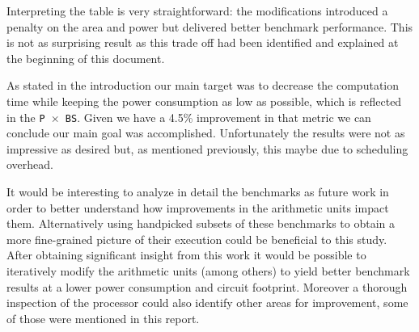 Interpreting the table is very straightforward: the modifications introduced a penalty on the area and power but delivered better benchmark performance. This is not as surprising result as this trade off had been identified and explained at the beginning of this document.

As stated in the introduction our main target was to decrease the computation time while keeping the power consumption as low as possible, which is reflected in the \texttt{P $\times$ BS}. Given we have a 4.5\% improvement in that metric we can conclude our main goal was accomplished. Unfortunately the results were not as impressive as desired but, as mentioned previously, this maybe due to scheduling overhead.

It would be interesting to analyze in detail the benchmarks as future work in order to better understand how improvements in the arithmetic units impact them. Alternatively using handpicked subsets of these benchmarks to obtain a more fine-grained picture of their execution could be beneficial to this study. After obtaining significant insight from this work it would be possible to iteratively modify the arithmetic units (among others) to yield better benchmark results at a lower power consumption and circuit footprint.
Moreover a thorough inspection of the processor could also identify other areas for improvement, some of those were mentioned in this report. 
